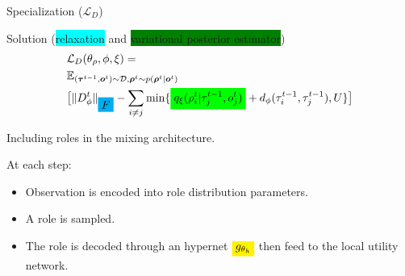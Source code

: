 \documentclass{beamer}
\newcommand{\mathcolorbox}[2]{\colorbox{#1}{$\displaystyle #2$}}
\begin{document}
    \begin{frame}{Specialization ($\mathcal{L}_{D}$)}
        \begin{exampleblock}{Solution (\colorbox{cyan}{relaxation} and \colorbox{green}{variational posterior estimator})}
            \begin{align*}
                &\mathcal{L}_D(\theta_\rho, \phi, \xi) =
                \\ &\mathbb{E}_{(\bm{\tau}^{t-1}, \bm{o}^t)\sim\mathcal{D}, \bm{\rho}^t\sim p(\bm{\rho}^t | \bm{o}^t)}
                \\ &\big[\|D_\phi^t\|_{\mathcolorbox{cyan}{F}} - \sum_{i\ne j}\min\{\mathcolorbox{green}{q_\xi(\rho^{t}_i| \tau^{t-1}_j, o^t_j)} + d_\phi(\tau^{t-1}_i, \tau^{t-1}_j), U\}\big]
            \end{align*}
        \end{exampleblock}

    \end{frame}


    \begin{frame}{Including roles in the mixing architecture.}

        At each step:
        \begin{itemize}
            \pause\item Observation is encoded into role distribution parameters.
            \pause\item A role is sampled.
            \pause\item The role is decoded through an hypernet $\mathcolorbox{yellow}{g_{\theta_h}}$ then feed to the local utility network.
        \end{itemize}

    \end{frame}

\end{document}
